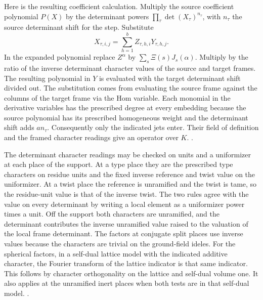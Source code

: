 Here is the resulting coefficient calculation. Multiply the
source coefficient polynomial \(P(X)\) by the determinant
powers \(\prod_\tau\det(X_\tau)^{n_\tau}\), with \(n_\tau\)
the source determinant shift for the step. Substitute
\[
 X_{\tau,i,j}=\sum_{h=1}^b Z_{\tau,h,i}Y_{\tau,h,j}.
\]
In the expanded polynomial replace \(Z^\alpha\) by
\(\sum_s\Xi(s)J_s(\alpha)\). Multiply by the ratio of the
inverse determinant character values of the source and target
frames. The resulting polynomial in \(Y\) is evaluated with
the target determinant shift divided out. The substitution
comes from evaluating the source frame against the columns
of the target frame via the Hom variable. Each monomial in
the derivative variables has the prescribed degree at every
embedding because the source polynomial has its prescribed
homogeneous weight and the determinant shift adds \(a n_\tau\).
Consequently only the indicated jets enter. Their field of
definition and the framed character readings give an operator
over \(K\).
.

The determinant character readings may be checked on units
and a uniformizer at each place of the support. At a type
place they are the prescribed type characters on residue
units and the fixed inverse reference and twist value on
the uniformizer. At a twist place the reference is unramified
and the twist is tame, so the residue-unit value is that
of the inverse twist. The two rules agree with the value
on every determinant by writing a local element as a
uniformizer power times a unit. Off the support both
characters are unramified, and the determinant contributes
the inverse unramified value raised to the valuation of
the local frame determinant. The factors at conjugate split
places use inverse values because the characters are trivial
on the ground-field ideles. For the spherical factors,
in a self-dual lattice model with the indicated additive
character, the Fourier transform of the lattice indicator is
that same indicator. This follows by character orthogonality
on the lattice and self-dual volume one. It also applies at
the unramified inert places when both tests are in that
self-dual model.
.

